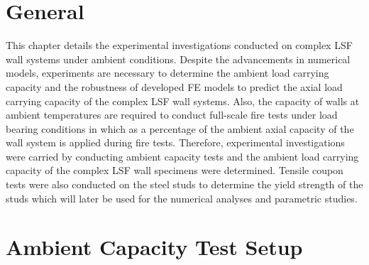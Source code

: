 \section{General}

This chapter details the experimental investigations conducted on complex LSF wall systems under ambient conditions. Despite the advancements in numerical models, experiments are necessary to determine the ambient load carrying capacity and the robustness of developed FE models to predict the axial load carrying capacity of the complex LSF wall systems. Also, the capacity of walls at ambient temperatures are required to conduct full-scale fire tests under load bearing conditions in which as a percentage of the ambient axial capacity of the wall system is applied during fire tests. Therefore, experimental investigations were carried by conducting ambient capacity tests and the ambient load carrying capacity of the complex LSF wall specimens were determined. Tensile coupon tests were also conducted on the steel studs to determine the yield strength of the studs which will later be used for the numerical analyses and parametric studies.  

\section{Ambient Capacity Test Setup}

